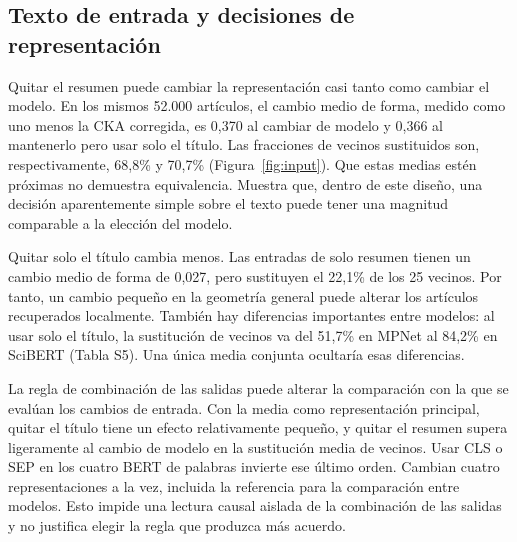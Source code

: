 \documentclass[12pt]{article}
\begin{document}
\subsection{Texto de entrada y decisiones de representación}
Quitar el resumen puede cambiar la representación casi tanto como cambiar el modelo. En los mismos 52.000 artículos, el cambio medio de forma, medido como uno menos la CKA corregida, es 0,370 al cambiar de modelo y 0,366 al mantenerlo pero usar solo el título. Las fracciones de vecinos sustituidos son, respectivamente, 68,8\% y 70,7\% (Figura~\ref{fig:input}). Que estas medias estén próximas no demuestra equivalencia. Muestra que, dentro de este diseño, una decisión aparentemente simple sobre el texto puede tener una magnitud comparable a la elección del modelo.


Quitar solo el título cambia menos. Las entradas de solo resumen tienen un cambio medio de forma de 0,027, pero sustituyen el 22,1\% de los 25 vecinos. Por tanto, un cambio pequeño en la geometría general puede alterar los artículos recuperados localmente. También hay diferencias importantes entre modelos: al usar solo el título, la sustitución de vecinos va del 51,7\% en MPNet al 84,2\% en SciBERT (Tabla S5). Una única media conjunta ocultaría esas diferencias.

La regla de combinación de las salidas puede alterar la comparación con la que se evalúan los cambios de entrada. Con la media como representación principal, quitar el título tiene un efecto relativamente pequeño, y quitar el resumen supera ligeramente al cambio de modelo en la sustitución media de vecinos. Usar CLS o SEP en los cuatro BERT de palabras invierte ese último orden. Cambian cuatro representaciones a la vez, incluida la referencia para la comparación entre modelos. Esto impide una lectura causal aislada de la combinación de las salidas y no justifica elegir la regla que produzca más acuerdo.
\end{document}
